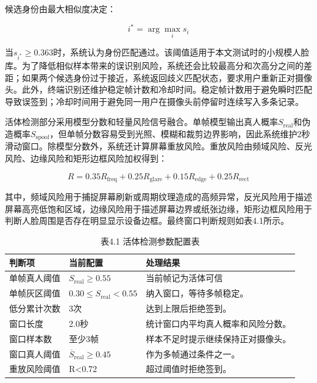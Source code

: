 \documentclass[UTF8]{heuthesis}
\begin{document}
候选身份由最大相似度决定：

\begin{equation*}
i^*=\arg\max_i s_i\tag{4.3}
\end{equation*}

当\(s_{i^*}\geq0.363\)时，系统认为身份匹配通过。该阈值适用于本文测试时的小规模人脸库。为了降低相似样本带来的误识别风险，系统还会比较最高分和次高分之间的差距；如果两个候选身份过于接近，系统返回歧义匹配状态，要求用户重新正对摄像头。此外，终端识别还维护稳定帧计数和冷却时间。稳定帧计数用于避免瞬时匹配导致误签到；冷却时间用于避免同一用户在摄像头前停留时连续写入多条记录。

活体检测部分采用模型分数和轻量风险信号融合。单帧模型输出真人概率\(S_{\mathrm{real}}\)和伪造概率\(S_{\mathrm{spoof}}\)，但单帧分数容易受到光照、模糊和裁剪边界影响，因此系统维护2秒滑动窗口。除模型分数外，系统还计算屏幕重放风险。重放风险由频域风险、反光风险、边缘风险和矩形边框风险加权得到：

\begin{equation*}
R=0.35R_{\mathrm{freq}}+0.25R_{\mathrm{glare}}+0.15R_{\mathrm{edge}}+0.25R_{\mathrm{rect}}\tag{4.4}
\end{equation*}

其中，频域风险用于捕捉屏幕刷新或周期纹理造成的高频异常，反光风险用于描述屏幕高亮低饱和区域，边缘风险用于描述屏幕边界或纸张边缘，矩形边框风险用于判断人脸周围是否存在明显显示设备边框。最终窗口判断规则如表4.1所示。

\begingroup
\small
\begin{longtable}{|>{\raggedright\arraybackslash}p{}|>{\raggedright\arraybackslash}p{}|>{\raggedright\arraybackslash}p{}|}
\caption{表4.1 活体检测参数配置表}\\
\hline
判断项 & 当前配置 & 处理结果 \\
\hline
单帧真人阈值 & \(S_{\mathrm{real}}\geq0.55\) & 当前帧记为活体可信 \\
\hline
单帧灰区阈值 & \(0.30\leq S_{\mathrm{real}}<0.55\) & 纳入窗口，等待多帧稳定。 \\
\hline
低分累计次数 & 3次 & 达到上限后拒绝签到。 \\
\hline
窗口长度 & 2.0秒 & 统计窗口内平均真人概率和风险分数。 \\
\hline
窗口样本数 & 至少3帧 & 样本不足时提示继续保持正对摄像头。 \\
\hline
窗口真人阈值 & \(\overline{S}_{\mathrm{real}}\geq0.45\) & 作为多帧通过条件之一。 \\
\hline
重放风险阈值 & R\textless{}0.72 & 超过阈值时拒绝签到。 \\
\hline
\end{longtable}
\endgroup
\end{document}

